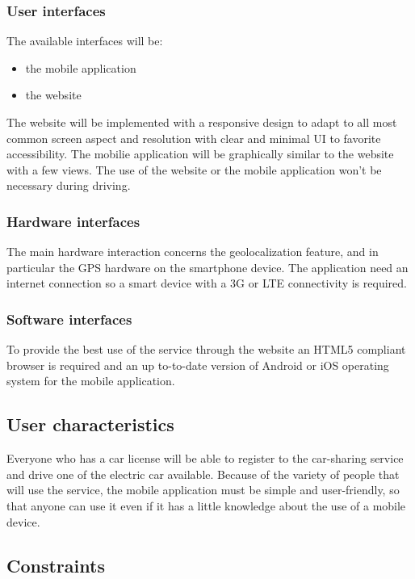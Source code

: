 \documentclass[english]{article}
\begin{document}
\subsubsection{User interfaces}
The available interfaces will be:
\begin{itemize}
	\item the mobile application
	\item the website
\end{itemize}
The website will be implemented with a responsive design to adapt to all most common screen aspect and resolution with clear and minimal UI to favorite accessibility.
The mobilie application will be graphically similar to the website with a few views.
The use of the website or the mobile application won't be necessary during driving. 

\subsubsection{Hardware interfaces}
The main hardware interaction concerns the geolocalization feature, and in particular the GPS hardware on the smartphone device.
The application need an internet connection so a smart device with a 3G or LTE connectivity is required.

\subsubsection{Software interfaces}
To provide the best use of the service through the website an HTML5 compliant browser is required and an up to-to-date version of Android or iOS operating system for the mobile application.





\subsection{User characteristics}
Everyone who has a car license will be able to register to the car-sharing service and drive one of the electric car available.
Because of the variety of people that will use the service, the mobile application must be simple and user-friendly, so that anyone can use it even if it has a little knowledge about the use of a mobile device.

\subsection{Constraints}
\end{document}
